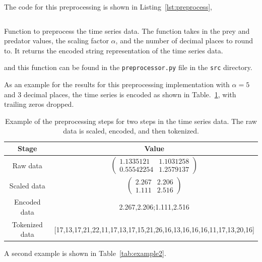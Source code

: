 \documentclass[11pt,a4paper]{article}
\begin{document}
The code for this preprocessing is shown in Listing~\ref{lst:preprocess},
\begin{listing}
\inputminted[firstline=64, lastline=83]{python}{../src/preprocessor.py}
\caption{Function to preprocess the time series data. The function takes in the prey and predator values, the scaling factor $\alpha$, and the number of decimal places to round to. It returns the encoded string representation of the time series data.}
\label{lst:preprocess}
\end{listing}
and this function can be found in the \texttt{preprocessor.py} file in the \texttt{src} directory.

As an example for the results for this preprocessing implementation with $\alpha = 5$ and 3 decimal places, the time series is encoded as shown in Table.~\ref{tab:example}, with trailing zeros dropped.

\begin{table}
    \centering
    \begin{tabular}{c|c}
        Stage & Value \\
        \hline
        Raw data & $\begin{pmatrix} 1.1335121  & 1.1031258 \\ 0.55542254  & 1.2579137 \end{pmatrix}$ \\
        Scaled data & $\begin{pmatrix} 2.267 & 2.206 \\ 1.111 & 2.516 \end{pmatrix}$ \\
        Encoded data & 2.267,2.206;1.111,2.516 \\
        Tokenized data & [17,13,17,21,22,11,17,13,17,15,21,26,16,13,16,16,16,11,17,13,20,16]
    \end{tabular}
    \caption{Example of the preprocessing steps for two steps in the time series data. The raw data is scaled, encoded, and then tokenized.}
    \label{tab:example}
\end{table}

A second example is shown in Table~\ref{tab:example2}.
\end{document}

